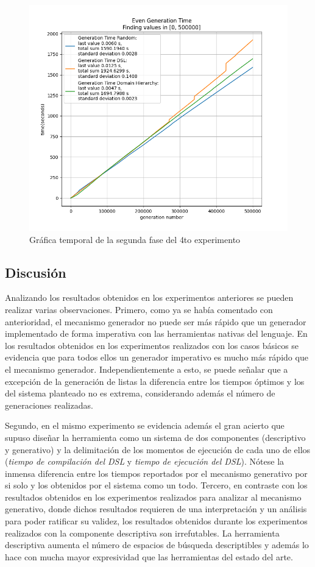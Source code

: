 \begin{figure}[!ht]
      \includegraphics[width=\linewidth]{Graphics/exp6.png}
      \caption{Gráfica temporal de la segunda fase del 4to experimento}
      \label{fig:exp6}
\end{figure}

\subsection{Discusión}

Analizando los resultados obtenidos en los experimentos anteriores se pueden realizar varias observaciones.
Primero, como ya se había comentado con anterioridad, el mecanismo generador no puede ser más
rápido que un generador implementado de forma imperativa con las herramientas nativas del lenguaje. En los
resultados obtenidos en los experimentos realizados con los casos básicos se evidencia que para todos ellos un generador
imperativo es mucho más rápido que el mecanismo generador. Independientemente a esto, se puede señalar que a
excepción de la generación de listas la diferencia entre los tiempos óptimos y los del sistema planteado no es
extrema, considerando además el número de generaciones realizadas.

Segundo, en el mismo experimento se evidencia además el gran acierto que supuso diseñar la herramienta
como un sistema de dos componentes (descriptivo y generativo) y la delimitación de los momentos de ejecución de cada uno de ellos
({\it tiempo de compilación del DSL} y {\it tiempo de ejecución del DSL}). Nótese la inmensa diferencia entre los 
tiempos reportados por el mecanismo generativo por si solo y los obtenidos por el sistema como un todo. 
Tercero, en contraste con los resultados obtenidos en los experimentos realizados para analizar al mecanismo generativo, donde
dichos resultados requieren de una interpretación y un análisis para poder ratificar su validez, los resultados
obtenidos durante los experimentos realizados con la componente descriptiva son irrefutables. La
herramienta descriptiva aumenta el número de espacios de búsqueda descriptibles y además lo hace con
mucha mayor expresividad que las herramientas del estado del arte.

